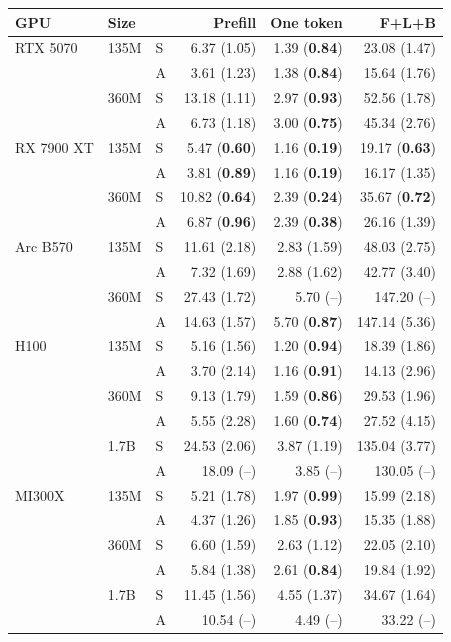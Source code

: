 \begin{tabular}{lllrrr}
\toprule
GPU & Size & & Prefill & One token & F+L+B \\
\midrule
RTX 5070 & 135M & S & 6.37 (1.05) & 1.39 (\textbf{0.84}) & 23.08 (1.47) \\
 &  & A & 3.61 (1.23) & 1.38 (\textbf{0.84}) & 15.64 (1.76) \\
 & 360M & S & 13.18 (1.11) & 2.97 (\textbf{0.93}) & 52.56 (1.78) \\
 &  & A & 6.73 (1.18) & 3.00 (\textbf{0.75}) & 45.34 (2.76) \\
RX 7900 XT & 135M & S & 5.47 (\textbf{0.60}) & 1.16 (\textbf{0.19}) & 19.17 (\textbf{0.63}) \\
 &  & A & 3.81 (\textbf{0.89}) & 1.16 (\textbf{0.19}) & 16.17 (1.35) \\
 & 360M & S & 10.82 (\textbf{0.64}) & 2.39 (\textbf{0.24}) & 35.67 (\textbf{0.72}) \\
 &  & A & 6.87 (\textbf{0.96}) & 2.39 (\textbf{0.38}) & 26.16 (1.39) \\
Arc B570 & 135M & S & 11.61 (2.18) & 2.83 (1.59) & 48.03 (2.75) \\
 &  & A & 7.32 (1.69) & 2.88 (1.62) & 42.77 (3.40) \\
 & 360M & S & 27.43 (1.72) & 5.70 (--) & 147.20 (--) \\
 &  & A & 14.63 (1.57) & 5.70 (\textbf{0.87}) & 147.14 (5.36) \\
H100 & 135M & S & 5.16 (1.56) & 1.20 (\textbf{0.94}) & 18.39 (1.86) \\
 &  & A & 3.70 (2.14) & 1.16 (\textbf{0.91}) & 14.13 (2.96) \\
 & 360M & S & 9.13 (1.79) & 1.59 (\textbf{0.86}) & 29.53 (1.96) \\
 &  & A & 5.55 (2.28) & 1.60 (\textbf{0.74}) & 27.52 (4.15) \\
 & 1.7B & S & 24.53 (2.06) & 3.87 (1.19) & 135.04 (3.77) \\
 &  & A & 18.09 (--) & 3.85 (--) & 130.05 (--) \\
MI300X & 135M & S & 5.21 (1.78) & 1.97 (\textbf{0.99}) & 15.99 (2.18) \\
 &  & A & 4.37 (1.26) & 1.85 (\textbf{0.93}) & 15.35 (1.88) \\
 & 360M & S & 6.60 (1.59) & 2.63 (1.12) & 22.05 (2.10) \\
 &  & A & 5.84 (1.38) & 2.61 (\textbf{0.84}) & 19.84 (1.92) \\
 & 1.7B & S & 11.45 (1.56) & 4.55 (1.37) & 34.67 (1.64) \\
 &  & A & 10.54 (--) & 4.49 (--) & 33.22 (--) \\
\bottomrule
\end{tabular}

